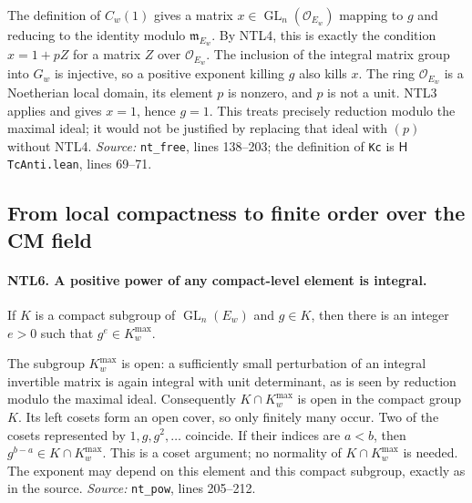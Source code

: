 The definition of \(C_w(1)\) gives a matrix
\(x\in\operatorname{GL}_n(\mathcal O_{E_w})\) mapping to \(g\) and
reducing to the identity modulo \(\mathfrak m_{E_w}\).
By NTL4, this is exactly the condition \(x=1+pZ\) for a matrix
\(Z\) over \(\mathcal O_{E_w}\).  The inclusion of the integral
matrix group into \(G_w\) is injective, so a positive exponent killing
\(g\) also kills \(x\).  The ring \(\mathcal O_{E_w}\) is a
Noetherian local domain, its element \(p\) is nonzero, and \(p\) is
not a unit.  NTL3 applies and gives \(x=1\), hence \(g=1\).
This treats precisely reduction modulo the maximal ideal; it would
not be justified by replacing that ideal with \((p)\) without NTL4.
\emph{Source:} \texttt{nt\_free}, lines 138--203; the definition of
\texttt{Kc} is \(\mathsf H\)\texttt{TcAnti.lean}, lines 69--71.

\subsection{From local compactness to finite order over the CM field}

\paragraph{NTL6. A positive power of any compact-level element is integral.}
\label{claim:NTL6}
If \(K\) is a compact subgroup of \(\operatorname{GL}_n(E_w)\) and
\(g\in K\), then there is an integer \(e>0\) such that
\(g^e\in K_w^{\max}\).

The subgroup \(K_w^{\max}\) is open: a sufficiently small perturbation
of an integral invertible matrix is again integral with unit
determinant, as is seen by reduction modulo the maximal ideal.
Consequently \(K\cap K_w^{\max}\) is open in the compact group \(K\).
Its left cosets form an open cover, so only finitely many occur.
Two of the cosets represented by \(1,g,g^2,\ldots\) coincide.  If
their indices are \(a<b\), then \(g^{b-a}\in K\cap K_w^{\max}\).
This is a coset argument; no normality of \(K\cap K_w^{\max}\) is
needed.  The exponent may depend on this element and this compact
subgroup, exactly as in the source.
\emph{Source:} \texttt{nt\_pow}, lines 205--212.

